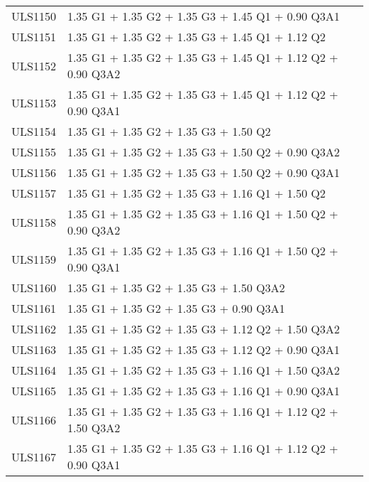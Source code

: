 \begin{center}
\begin{small}
\begin{longtable}{|l|p{10cm}|}
ULS1150 & 1.35 G1 + 1.35 G2 + 1.35 G3 + 1.45 Q1 + 0.90 Q3A1\\
ULS1151 & 1.35 G1 + 1.35 G2 + 1.35 G3 + 1.45 Q1 + 1.12 Q2\\
ULS1152 & 1.35 G1 + 1.35 G2 + 1.35 G3 + 1.45 Q1 + 1.12 Q2 + 0.90 Q3A2\\
ULS1153 & 1.35 G1 + 1.35 G2 + 1.35 G3 + 1.45 Q1 + 1.12 Q2 + 0.90 Q3A1\\
ULS1154 & 1.35 G1 + 1.35 G2 + 1.35 G3 + 1.50 Q2\\
ULS1155 & 1.35 G1 + 1.35 G2 + 1.35 G3 + 1.50 Q2 + 0.90 Q3A2\\
ULS1156 & 1.35 G1 + 1.35 G2 + 1.35 G3 + 1.50 Q2 + 0.90 Q3A1\\
ULS1157 & 1.35 G1 + 1.35 G2 + 1.35 G3 + 1.16 Q1 + 1.50 Q2\\
ULS1158 & 1.35 G1 + 1.35 G2 + 1.35 G3 + 1.16 Q1 + 1.50 Q2 + 0.90 Q3A2\\
ULS1159 & 1.35 G1 + 1.35 G2 + 1.35 G3 + 1.16 Q1 + 1.50 Q2 + 0.90 Q3A1\\
ULS1160 & 1.35 G1 + 1.35 G2 + 1.35 G3 + 1.50 Q3A2\\
ULS1161 & 1.35 G1 + 1.35 G2 + 1.35 G3 + 0.90 Q3A1\\
ULS1162 & 1.35 G1 + 1.35 G2 + 1.35 G3 + 1.12 Q2 + 1.50 Q3A2\\
ULS1163 & 1.35 G1 + 1.35 G2 + 1.35 G3 + 1.12 Q2 + 0.90 Q3A1\\
ULS1164 & 1.35 G1 + 1.35 G2 + 1.35 G3 + 1.16 Q1 + 1.50 Q3A2\\
ULS1165 & 1.35 G1 + 1.35 G2 + 1.35 G3 + 1.16 Q1 + 0.90 Q3A1\\
ULS1166 & 1.35 G1 + 1.35 G2 + 1.35 G3 + 1.16 Q1 + 1.12 Q2 + 1.50 Q3A2\\
ULS1167 & 1.35 G1 + 1.35 G2 + 1.35 G3 + 1.16 Q1 + 1.12 Q2 + 0.90 Q3A1\\
\hline
\end{longtable}
\end{small}
\end{center}
